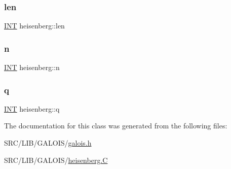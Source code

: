 \mbox{\label{classheisenberg_a9b4d0cf0672b763bda59a411ab307b30}} 
\subsubsection{\texorpdfstring{len}{len}}
{\footnotesize\ttfamily \mbox{\hyperlink{galois_8h_a09fddde158a3a20bd2dcadb609de11dc}{I\+NT}} heisenberg\+::len}

\mbox{\label{classheisenberg_a5f434f747ceebaede3371d5e265c40e0}} 
\subsubsection{\texorpdfstring{n}{n}}
{\footnotesize\ttfamily \mbox{\hyperlink{galois_8h_a09fddde158a3a20bd2dcadb609de11dc}{I\+NT}} heisenberg\+::n}

\mbox{\label{classheisenberg_af9e931f2bc1ca76d4c28d1bf8ea3c794}} 
\subsubsection{\texorpdfstring{q}{q}}
{\footnotesize\ttfamily \mbox{\hyperlink{galois_8h_a09fddde158a3a20bd2dcadb609de11dc}{I\+NT}} heisenberg\+::q}



The documentation for this class was generated from the following files\+:\begin{DoxyCompactItemize}
\item 
S\+R\+C/\+L\+I\+B/\+G\+A\+L\+O\+I\+S/\mbox{\hyperlink{galois_8h}{galois.\+h}}\item 
S\+R\+C/\+L\+I\+B/\+G\+A\+L\+O\+I\+S/\mbox{\hyperlink{heisenberg_8_c}{heisenberg.\+C}}\end{DoxyCompactItemize}
